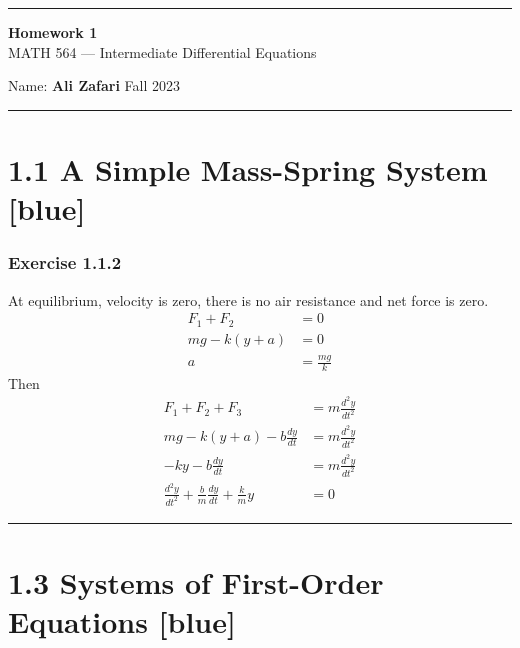 \documentclass[12pt, letterpaper]{scrartcl}
\begin{document}
\begin{center}
    \hrule
    \vspace{0.4cm}
    { \textbf{{\large Homework 1}} \\ MATH 564 --- Intermediate Differential Equations}
\end{center}
{ Name: \textbf{Ali Zafari} \hspace{\fill} Fall 2023 } \newline\hrule

\section*{1.1 A Simple Mass-Spring System \xrfill[2pt]{3pt}[blue]}

\subsubsection*{Exercise 1.1.2}
At equilibrium, velocity is zero, there is no air resistance and net force is zero.
\begin{align*}
    F_1+F_2&=0\\
    mg-k(y+a)&=0\\
    a&=\frac{mg}{k}
\end{align*}
Then
\begin{align*}
    F_1+F_2+F_3&=m\frac{d^2y}{dt^2}\\
    mg-k(y+a)-b\frac{dy}{dt}&=m\frac{d^2y}{dt^2}\\
    -ky-b\frac{dy}{dt}&=m\frac{d^2y}{dt^2}\\
    \frac{d^2y}{dt^2}+\frac{b}{m}\frac{dy}{dt}+\frac{k}{m}y&=0
\end{align*}
\vskip1mm\hrule
\clearpage

\section*{1.3 Systems of First-Order Equations \xrfill[2pt]{3pt}[blue]}
\end{document}
